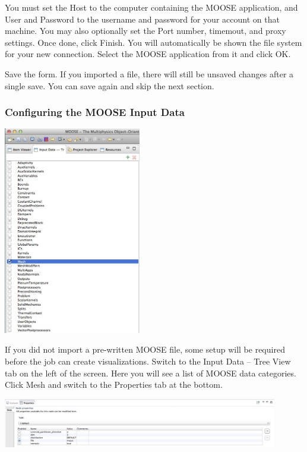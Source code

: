 \documentclass{article}
\begin{document}
You must set the Host to the computer containing the MOOSE application, and User
and Password to the username and password for your account on that machine. You
may also optionally set the Port number, timemout, and proxy settings. Once
done, click Finish. You will automatically be shown the file system for your new
connection. Select the MOOSE application from it and click OK.

Save the form. If you imported a file, there will still be unsaved changes after
a single save. You can save again and skip the next section. 

\subsubsection{Configuring the MOOSE Input Data}

\begin{center}
\includegraphics[width=6cm]{images/MOOSETree} 
\end{center}

If you did not import a pre-written MOOSE file, some setup will be
required before the job can create visualizations. Switch to the Input Data --
Tree View tab on the left of the screen. Here you will see a list of MOOSE data
categories. Click Mesh and switch to the Properties tab at the bottom.

\begin{center}
\includegraphics[width=12cm]{images/MeshProperty} 
\end{center}
\end{document}
